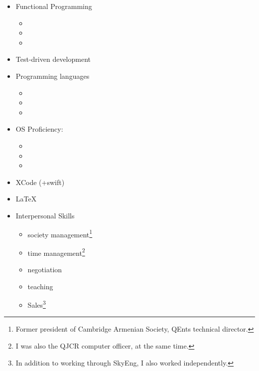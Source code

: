 \documentclass{CurriculumVitae}[10pt, draft, condensed]
\begin{document}
\begin{multicols}{4}
\begin{itemize}[topsep=0pt]
  \item {\footnotesize Functional Programming}
    \begin{itemize}[topsep=0pt, partopsep=0pt]
      \setlength{\itemsep}{-0.3em}
    \item {}
    \item {}
    \item {}
    \end{itemize}
  \item {\footnotesize Test-driven development}
  \item {\footnotesize Programming languages}
    \begin{itemize}[topsep=0pt, partopsep=0pt]
      \setlength{\itemsep}{-0.3em}
    \item {}
    \item {}
    \item {}
    \end{itemize}
  \item {\footnotesize OS Proficiency:}
    \begin{itemize}[topsep=0pt, partopsep=0pt]
      \setlength{\itemsep}{-0.3em}
    \item {}
    \item {}
    \item {}
    \end{itemize}
  \item {\footnotesize XCode (+swift)}
  \item {\footnotesize \LaTeX{}}
  \item {\footnotesize Interpersonal Skills}
    \begin{itemize}[topsep=0pt, partopsep=0pt]
      \setlength{\itemsep}{-0.3em}
    \item society management\footnote{Former president of Cambridge
        Armenian Society, QEnts technical director.}
    \item time management\footnote{I was also the QJCR computer
        officer, at the same time. }
    \item negotiation
    \item teaching
    \item Sales\footnote{In addition to working through SkyEng, I also
        worked independently. }
    \end{itemize}
  \end{itemize}

\end{multicols}
\end{document}
